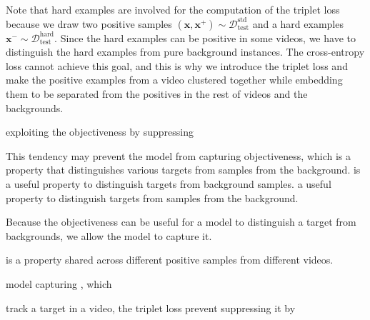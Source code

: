 \documentclass[letterpaper]{article} %
\def \x{\mathbf{x}}
\def \dataval{\mathcal{D}_\text{test}}
\begin{document}
Note that hard examples are involved for the computation of the triplet loss because we draw two positive samples $(\x, \x^+)\sim\dataval^\text{std}$ and a hard examples $\x^- \sim \dataval^\text{hard}$.
Since the hard examples can be positive in some videos, we have to distinguish the hard examples from pure background instances.
The cross-entropy loss cannot achieve this goal, and this is why we introduce the triplet loss and make the positive examples from a video clustered together while embedding them to be separated from the positives in the rest of videos  and the backgrounds.



\iffalse

exploiting the objectiveness by suppressing 

This tendency may prevent the model from capturing objectiveness, which is a property that distinguishes various targets from samples from the background. is a useful property to distinguish targets from background samples.
a useful property to distinguish targets from samples from the background.



Because the objectiveness can be useful for a model to distinguish a target from backgrounds, we allow the model to capture it.


is a property shared across different positive samples from different videos.

model capturing , which 

track a target in a video, the triplet loss prevent suppressing it by  
\end{document}
